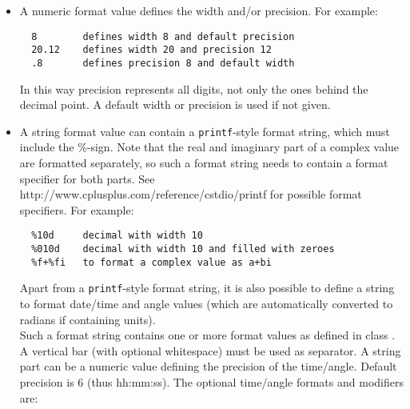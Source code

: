 \begin{itemize}
\item A numeric format value defines the width and/or precision. For example:
\begin{verbatim}
  8        defines width 8 and default precision
  20.12    defines width 20 and precision 12
  .8       defines precision 8 and default width
\end{verbatim}
In this way precision represents all digits, not only the ones behind
the decimal point. A default width or precision is used if not given.
\item A string format value can contain a \texttt{printf}-style format
  string, which must include the \%-sign.
  Note that the real and imaginary part of a complex value are
  formatted separately, so such a format string needs to contain a
  format specifier for
  both parts. See 
  {http://www.cplusplus.com/reference/cstdio/printf} for possible
  format specifiers.
  For example:
\begin{verbatim}
  %10d     decimal with width 10
  %010d    decimal with width 10 and filled with zeroes
  %f+%fi   to format a complex value as a+bi
\end{verbatim}
  Apart from a \texttt{printf}-style format string, it is also possible
  to define a string to format date/time and angle values (which are
  automatically converted to radians if containing units).
  \\Such a format string contains one or more format values as defined in
  class .
  A vertical bar (with optional whitespace) must be used as separator.
  A string part can be a numeric value defining the precision of the
  time/angle. Default precision is 6 (thus hh:mm:ss).
The optional time/angle formats and modifiers are:


\end{itemize}
